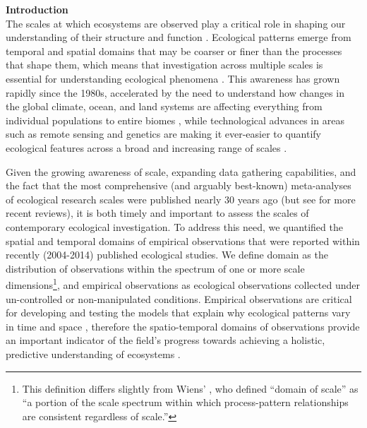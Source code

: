 \documentclass[12pt]{article}
\begin{document}
\vspace{10pt}
\noindent \textbf{Introduction}
\vspace{5pt}
\\
The scales at which ecosystems are observed play a critical role in shaping our understanding of their structure and function \cite{levin_problem_1992,chave_problem_2013,wiens_spatial_1989}.  Ecological patterns emerge from temporal and spatial domains that may be coarser or finer than the processes that shape them, which means that investigation across multiple scales is essential for understanding ecological phenomena \cite{levin_problem_1992,sandel_scale_2009}. This awareness has grown rapidly since the 1980s\cite{schneider_rise_2001}, accelerated by the need to understand how changes in the global climate, ocean, and land systems are affecting everything from individual populations \cite{tingley_push_2012} to entire biomes \cite{xiao_photosynthetic_2004}, while technological advances in areas such as remote sensing and genetics are making it ever-easier to quantify ecological features across a broad and increasing range of scales \cite{schneider_rise_2001, chave_problem_2013}.  

Given the growing awareness of scale, expanding data gathering capabilities, and the fact that the most comprehensive (and arguably best-known) meta-analyses \cite{tilman_ecological_1989,kareiva_spatial_1988} of ecological research scales were published nearly 30 years ago (but see \cite{porter_wireless_2005, sandel_scale_2009} for more recent reviews), it is both timely and important to assess the scales of contemporary ecological investigation. To address this need, we quantified the spatial and temporal domains of empirical observations that were reported within recently (2004-2014) published ecological studies. We define domain as the distribution of observations within the spectrum of one or more scale dimensions\footnote{This definition differs slightly from Wiens' \cite{wiens_spatial_1989}, who defined ``domain of scale'' as ``a portion of the scale spectrum within which process-pattern relationships are consistent regardless of scale.''}, and empirical observations as ecological observations collected under un-controlled or non-manipulated conditions. Empirical observations are critical for developing and testing the models that explain why ecological patterns vary in time and space \cite{levin_problem_1992, tilman_ecological_1989}, therefore the spatio-temporal domains of observations provide an important indicator of the field's progress towards achieving a holistic, predictive understanding of ecosystems \cite{chave_problem_2013,levin_problem_1992}. 
\end{document}
